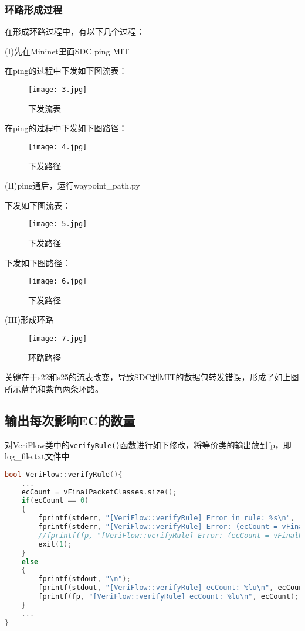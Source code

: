 \documentclass{xjtureport}
\begin{document}
\subsubsection{环路形成过程}
在形成环路过程中，有以下几个过程：\par 
(I)先在Mininet里面SDC ping MIT\par 
\quad \quad 在ping的过程中下发如下图流表：
\begin{figure}[H]
	\centering
	\texttt{[image: 3.jpg]}
	\caption{下发流表}
\end{figure}
\quad \quad 在ping的过程中下发如下图路径：
\begin{figure}[H]
	\centering
	\texttt{[image: 4.jpg]}
	\caption{下发路径}
\end{figure}
(II)ping通后，运行waypoint\_path.py\par 
\quad \quad 下发如下图流表：
\begin{figure}[H]
	\centering
	\texttt{[image: 5.jpg]}
	\caption{下发路径}
\end{figure}
\quad \quad 下发如下图路径：
\begin{figure}[H]
	\centering
	\texttt{[image: 6.jpg]}
	\caption{下发路径}
\end{figure}
(III)形成环路\par 
\begin{figure}[H]
	\centering
	\texttt{[image: 7.jpg]}
	\caption{环路路径}
\end{figure}
关键在于s22和s25的流表改变，导致SDC到MIT的数据包转发错误，形成了如上图所示蓝色和紫色两条环路。
\subsection{输出每次影响EC的数量}
对VeriFlow类中的\texttt{verifyRule()}函数进行如下修改，将等价类的输出放到fp，即log\_file.txt文件中
\begin{lstlisting}[language=c++]
bool VeriFlow::verifyRule(){
	...
	ecCount = vFinalPacketClasses.size();
	if(ecCount == 0)
	{
		fprintf(stderr, "[VeriFlow::verifyRule] Error in rule: %s\n", rule.toString().c_str());
		fprintf(stderr, "[VeriFlow::verifyRule] Error: (ecCount = vFinalPacketClasses.size() = 0). Terminating process.\n");
		//fprintf(fp, "[VeriFlow::verifyRule] Error: (ecCount = vFinalPacketClasses.size() = 0). Terminating process.\n");
		exit(1);
	}
	else
	{
		fprintf(stdout, "\n");
		fprintf(stdout, "[VeriFlow::verifyRule] ecCount: %lu\n", ecCount);
		fprintf(fp, "[VeriFlow::verifyRule] ecCount: %lu\n", ecCount);
	}
	...
}
\end{lstlisting}
\end{document}
